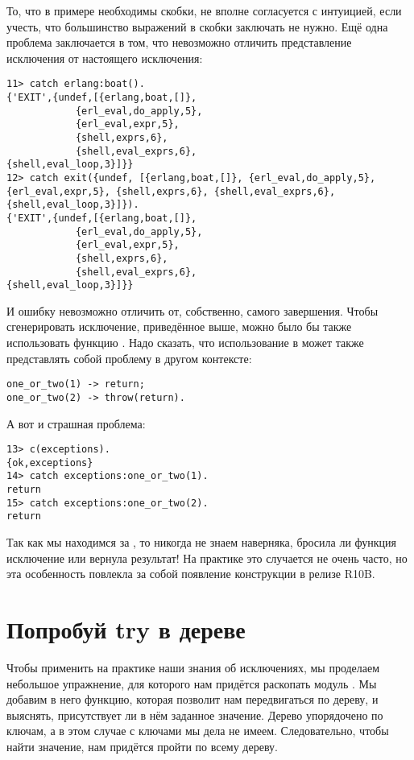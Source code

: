 То, что в примере необходимы скобки, не вполне согласуется с интуицией, если учесть, что большинство выражений в скобки заключать не нужно.
Ещё одна проблема заключается в том, что невозможно отличить представление исключения от настоящего исключения:
\begin{lstlisting}[style=erlang]
11> catch erlang:boat().
{'EXIT',{undef,[{erlang,boat,[]},
            {erl_eval,do_apply,5},
            {erl_eval,expr,5},
            {shell,exprs,6},
            {shell,eval_exprs,6},
{shell,eval_loop,3}]}}
12> catch exit({undef, [{erlang,boat,[]}, {erl_eval,do_apply,5}, {erl_eval,expr,5}, {shell,exprs,6}, {shell,eval_exprs,6}, {shell,eval_loop,3}]}).
{'EXIT',{undef,[{erlang,boat,[]},
            {erl_eval,do_apply,5},
            {erl_eval,expr,5},
            {shell,exprs,6},
            {shell,eval_exprs,6},
{shell,eval_loop,3}]}}
\end{lstlisting}

И ошибку невозможно отличить от, собственно, самого завершения.
Чтобы сгенерировать исключение, приведённое выше, можно было бы также использовать функцию .
Надо сказать, что использование  в  может также представлять собой проблему в другом контексте:
\begin{lstlisting}[style=erlang]
one_or_two(1) -> return;
one_or_two(2) -> throw(return).
\end{lstlisting}

А вот и страшная проблема:
\begin{lstlisting}[style=erlang]
13> c(exceptions).
{ok,exceptions}
14> catch exceptions:one_or_two(1).
return
15> catch exceptions:one_or_two(2).
return
\end{lstlisting}

Так как мы находимся за , то никогда не знаем наверняка, бросила ли функция исключение или вернула результат!
На практике это случается не очень часто, но эта особенность повлекла за собой появление конструкции  в релизе R10B.
\section{Попробуй try в дереве}
\label{try-a-try-in-a-tree}
Чтобы применить на практике наши знания об исключениях, мы проделаем небольшое упражнение, для которого нам придётся раскопать модуль .
Мы добавим в него функцию, которая позволит нам передвигаться по дереву, и выяснять, присутствует ли в нём заданное значение.
Дерево упорядочено по ключам, а в этом случае с ключами мы дела не имеем.
Следовательно, чтобы найти значение, нам придётся пройти по всему дереву.


